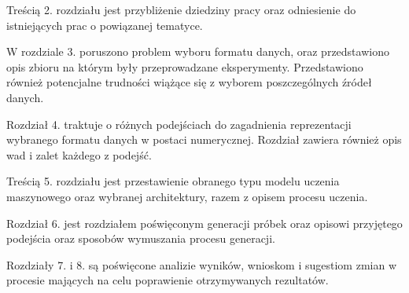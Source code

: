 {{        Treścią 2. rozdziału jest przybliżenie dziedziny pracy oraz odniesienie do istniejących prac o powiązanej tematyce.
        
        W rozdziale 3. poruszono problem wyboru formatu danych, oraz przedstawiono opis zbioru na którym
        były przeprowadzane eksperymenty. Przedstawiono również potencjalne trudności wiążące się z wyborem
        poszczególnych źródeł danych.

        Rozdział 4. traktuje o różnych podejściach do zagadnienia reprezentacji wybranego formatu 
        danych w postaci numerycznej. Rozdział zawiera również opis wad i zalet każdego z podejść.

        Treścią 5. rozdziału jest przestawienie obranego typu modelu uczenia maszynowego oraz 
        wybranej architektury, razem z opisem procesu uczenia.

        Rozdział 6. jest rozdziałem poświęconym generacji próbek oraz opisowi przyjętego podejścia oraz sposobów 
        wymuszania procesu generacji.

        Rozdziały 7. i 8. są poświęcone analizie wyników, wnioskom i sugestiom zmian w procesie mających na celu 
        poprawienie otrzymywanych rezultatów.
    }
}


